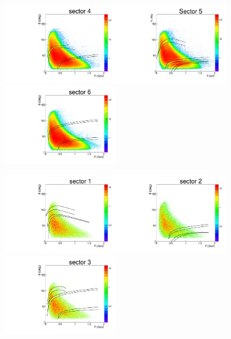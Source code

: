 \begin{figure}[htp]
\begin{center}
\begin{minipage}{.99\textwidth}
\begin{framed}
\includegraphics[width=5cm]{pictures/other_cuts/fiduch/th_vs_p_pip/pip_th_vs_p_sector4.pdf}\includegraphics[width=5cm]{pictures/other_cuts/fiduch/th_vs_p_pip/pip_th_vs_p_sector5.pdf}\includegraphics[width=5cm]{pictures/other_cuts/fiduch/th_vs_p_pip/pip_th_vs_p_sector6.pdf}
\end{framed}
\end{minipage}
\begin{minipage}{.99\textwidth}
\begin{framed}
\includegraphics[width=5cm]{pictures/other_cuts/fiduch/th_vs_p_pip_sim/pip_th_vs_p_sim_sector1.pdf}\includegraphics[width=5cm]{pictures/other_cuts/fiduch/th_vs_p_pip_sim/pip_th_vs_p_sim_sector2.pdf}\includegraphics[width=5cm]{pictures/other_cuts/fiduch/th_vs_p_pip_sim/pip_th_vs_p_sim_sector3.pdf}

\end{framed}
\end{minipage}
\end{center}
\end{figure}

